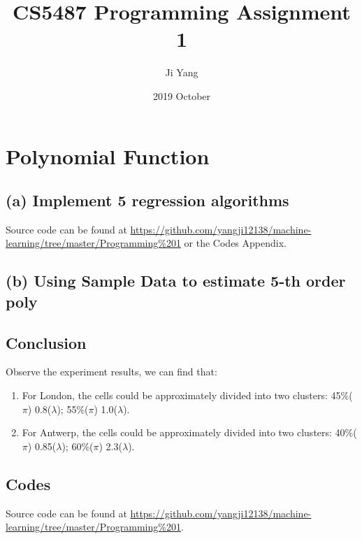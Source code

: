 \documentclass{article}
\title{CS5487 Programming Assignment 1}
\date{2019 October}
\author{Ji Yang}
\begin{document}
\maketitle


\section*{Polynomial Function}
\subsection*{(a) Implement 5 regression algorithms}
Source code can be found at \url{https://github.com/yangji12138/machine-learning/tree/master/Programming%201} or the Codes Appendix.

\subsection*{(b) Using Sample Data to estimate 5-th order poly}

\subsection*{Conclusion}
Observe the experiment results, we can find that:

\begin{enumerate}[label=(\roman*)]
    \item For London, the cells could be approximately divided into two clusters: 45\%($\pi$) 0.8($\lambda$); 55\%($\pi$) 1.0($\lambda$).
    \item For Antwerp, the cells could be approximately divided into two clusters: 40\%($\pi$) 0.85($\lambda$); 60\%($\pi$) 2.3($\lambda$).
\end{enumerate}

\subsection*{Codes}

Source code can be found at \url{https://github.com/yangji12138/machine-learning/tree/master/Programming%201}.

%
\end{document}
